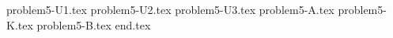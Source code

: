 \documentclass{../../../../style/mkimain}
\begin{document}
{problem5-U1.tex}
{problem5-U2.tex}
{problem5-U3.tex}
{problem5-A.tex}
{problem5-K.tex}
{problem5-B.tex}
{end.tex}
\end{document}
